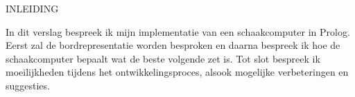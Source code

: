 INLEIDING

In dit verslag bespreek ik mijn implementatie van een schaakcomputer in Prolog. Eerst zal de bordrepresentatie worden besproken en daarna bespreek ik hoe de schaakcomputer bepaalt wat de beste volgende zet is. Tot slot bespreek ik moeilijkheden tijdens het ontwikkelingsproces, alsook mogelijke verbeteringen en suggesties.
